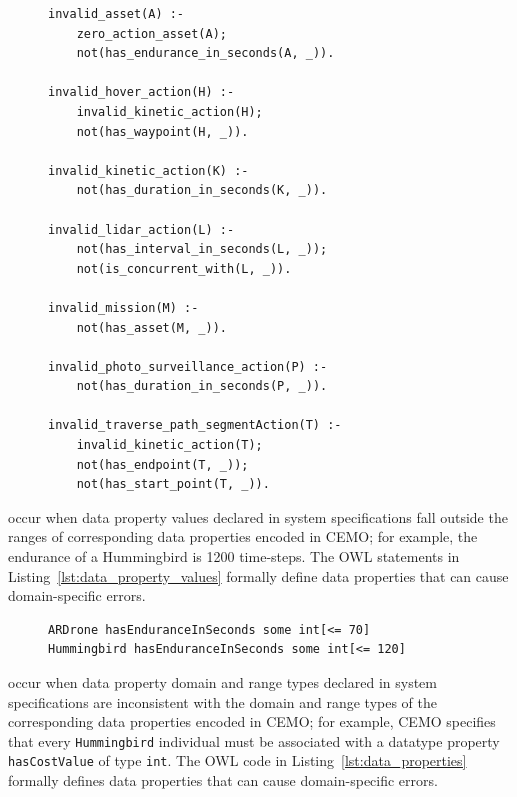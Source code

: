 {\begin{figure}[ht]
\begin{lstlisting}[caption={Existential restrictions encompassed in Prolog rules},label=lst:existential_restrictions_in_Prolog]
invalid_asset(A) :-
    zero_action_asset(A);
    not(has_endurance_in_seconds(A, _)).

invalid_hover_action(H) :-
    invalid_kinetic_action(H);
    not(has_waypoint(H, _)).

invalid_kinetic_action(K) :-
    not(has_duration_in_seconds(K, _)).

invalid_lidar_action(L) :-
    not(has_interval_in_seconds(L, _));
    not(is_concurrent_with(L, _)).

invalid_mission(M) :-
    not(has_asset(M, _)).

invalid_photo_surveillance_action(P) :-
    not(has_duration_in_seconds(P, _)).

invalid_traverse_path_segmentAction(T) :-
    invalid_kinetic_action(T);
    not(has_endpoint(T, _));
    not(has_start_point(T, _)).
\end{lstlisting}
\end{figure}

 occur when data property values declared in system specifications fall outside the ranges of corresponding data properties encoded in CEMO; for example, the endurance of a Hummingbird is 1200 time-steps. The OWL statements in Listing~\ref{lst:data_property_values} formally define data properties that can cause domain-specific errors.

\begin{figure}[ht]
\begin{lstlisting}[caption={Data property statements specified in OWL},label=lst:data_property_values]
ARDrone hasEnduranceInSeconds some int[<= 70]
Hummingbird hasEnduranceInSeconds some int[<= 120]
\end{lstlisting}
\end{figure}

 occur when data property domain and range types declared in system specifications are inconsistent with the domain and range types of the corresponding data properties encoded in CEMO; for example, CEMO specifies that every \texttt{Hummingbird} individual must be associated with a datatype property \texttt{hasCostValue} of type \texttt{int}. The OWL code in Listing~\ref{lst:data_properties} formally defines data properties that can cause domain-specific errors.

}
